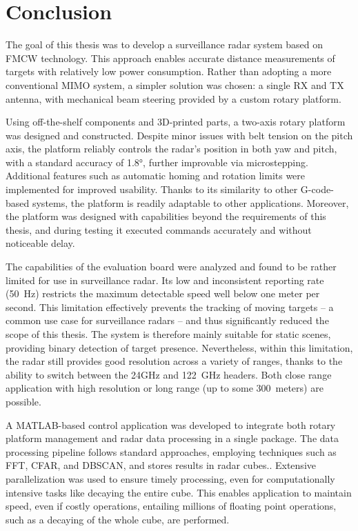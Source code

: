 \chapter*{Conclusion}

The goal of this thesis was to develop a surveillance radar system based on FMCW technology.
This approach enables accurate distance measurements of targets with relatively low power consumption.
Rather than adopting a more conventional MIMO system, a simpler solution was chosen: a single RX and TX antenna, with mechanical beam steering provided by a custom rotary platform.

Using off-the-shelf components and 3D-printed parts, a two-axis rotary platform was designed and constructed.
Despite minor issues with belt tension on the pitch axis, the platform reliably controls the radar’s position in both yaw and pitch, with a standard accuracy of 1.8°, further improvable via microstepping.
Additional features such as automatic homing and rotation limits were implemented for improved usability.
Thanks to its similarity to other G-code-based systems, the platform is readily adaptable to other applications.
Moreover, the platform was designed with capabilities beyond the requirements of this thesis, and during testing it executed commands accurately and without noticeable delay.

The capabilities of the \sidar evaluation board were analyzed and found to be rather limited for use in surveillance radar.
Its low and inconsistent reporting rate (50~Hz) restricts the maximum detectable speed well below one meter per second.
This limitation effectively prevents the tracking of moving targets -- a common use case for surveillance radars -- and thus significantly reduced the scope of this thesis.
The system is therefore mainly suitable for static scenes, providing binary detection of target presence.
Nevertheless, within this limitation, the radar still provides good resolution across a variety of ranges, thanks to the ability to switch between the 24GHz and 122~GHz headers.
Both close range application with high resolution or long range (up to some 300~meters) are possible.

A MATLAB-based control application was developed to integrate both rotary platform management and radar data processing in a single package.
 The data processing pipeline follows standard approaches, employing techniques such as FFT, CFAR, and DBSCAN, and stores results in radar cubes..
Extensive parallelization was used to ensure timely processing, even for computationally intensive tasks like decaying the entire cube.
This enables application to maintain speed, even if costly operations, entailing millions of floating point operations, such as a decaying of the whole cube, are performed.

